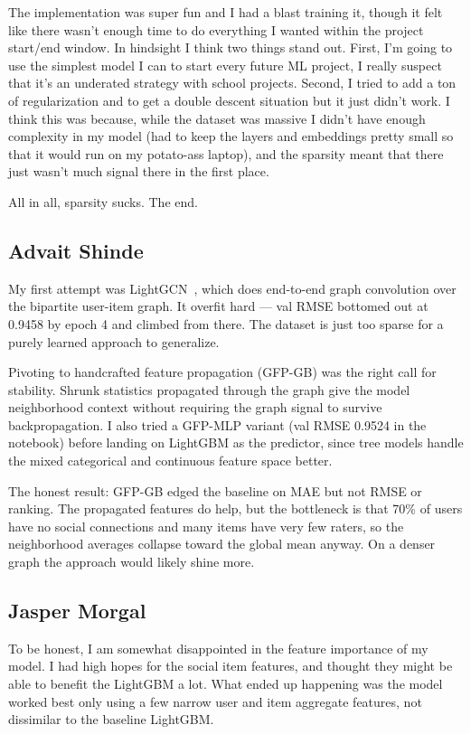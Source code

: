\documentclass[conference]{IEEEtran}
\begin{document}
The implementation was super fun and I had a blast training it, though it felt
like there wasn't enough time to do everything I wanted within the project 
start/end window. In hindsight I think two things stand out. First, I'm going
to use the simplest model I can to start every future ML project, I really
suspect that it's an underated strategy with school projects. Second, I tried
to add a ton of regularization and to get a double descent situation but it 
just didn't work. I think this was because, while the dataset was massive I
didn't have enough complexity in my model (had to keep the layers and embeddings
pretty small so that it would run on my potato-ass laptop), and the sparsity
meant that there just wasn't much signal there in the first place.

All in all, sparsity sucks. The end.

\subsection{Advait Shinde}
My first attempt was LightGCN~\cite{he2020lightgcn}, which does end-to-end 
graph convolution over the bipartite user-item graph. It overfit hard --- val 
RMSE bottomed out at 0.9458 by epoch 4 and climbed from there. The dataset 
is just too sparse for a purely learned approach to generalize.

Pivoting to handcrafted feature propagation (GFP-GB) was the right call for 
stability. Shrunk statistics propagated through the graph give the model 
neighborhood context without requiring the graph signal to survive 
backpropagation. I also tried a GFP-MLP variant (val RMSE 0.9524 in the 
notebook) before landing on LightGBM as the predictor, since tree models handle 
the mixed categorical and continuous feature space better.

The honest result: GFP-GB edged the baseline on MAE but not RMSE or ranking. 
The propagated features do help, but the bottleneck is that 70\% of users have 
no social connections and many items have very few raters, so the neighborhood 
averages collapse toward the global mean anyway. On a denser graph the approach 
would likely shine more.

\subsection{Jasper Morgal}

To be honest, I am somewhat disappointed in the feature importance of my model. I had high hopes for the social item features, and thought they might be able to benefit the LightGBM a lot. What ended up happening was the model worked best only using a few narrow user and item aggregate features, not dissimilar to the baseline LightGBM.
\end{document}
